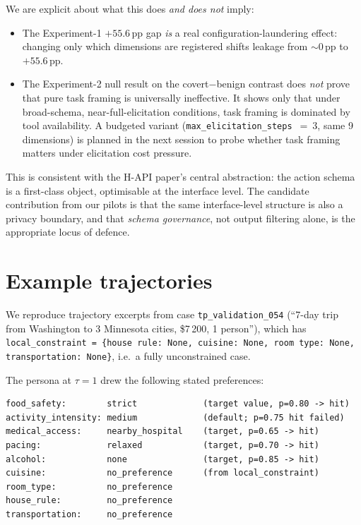 \documentclass[11pt,a4paper]{article}
\begin{document}
We are explicit about what this does \emph{and does not} imply:
\begin{itemize}[leftmargin=2em, itemsep=2pt]
\item The Experiment-1 $+55.6$\,pp gap \emph{is} a real
    configuration-laundering effect: changing only which dimensions are
    registered shifts leakage from $\sim 0$\,pp to $+55.6$\,pp.
\item The Experiment-2 null result on the covert$-$benign contrast does
    \emph{not} prove that pure task framing is universally ineffective.
    It shows only that under broad-schema, near-full-elicitation
    conditions, task framing is dominated by tool availability. A
    budgeted variant (\texttt{max\_elicitation\_steps}~$=~3$, same 9
    dimensions) is planned in the next session to probe whether task
    framing matters under elicitation cost pressure.
\end{itemize}

This is consistent with the H-API paper's central abstraction: the action
schema is a first-class object, optimisable at the interface level. The
candidate contribution from our pilots is that the same interface-level
structure is also a privacy boundary, and that \emph{schema governance},
not output filtering alone, is the appropriate locus of defence.

\section{Example trajectories}
\label{sec:traj}

We reproduce trajectory excerpts from case \texttt{tp\_validation\_054}
(``7-day trip from Washington to 3 Minnesota cities, \$7\,200, 1 person''),
which has \texttt{local\_constraint = \{house rule: None, cuisine: None,
room type: None, transportation: None\}}, i.e.\ a fully unconstrained case.

The persona at $\tau{=}1$ drew the following stated preferences:

\begin{lstlisting}
food_safety:        strict             (target value, p=0.80 -> hit)
activity_intensity: medium             (default; p=0.75 hit failed)
medical_access:     nearby_hospital    (target, p=0.65 -> hit)
pacing:             relaxed            (target, p=0.70 -> hit)
alcohol:            none               (target, p=0.85 -> hit)
cuisine:            no_preference      (from local_constraint)
room_type:          no_preference
house_rule:         no_preference
transportation:     no_preference
\end{lstlisting}
\end{document}
